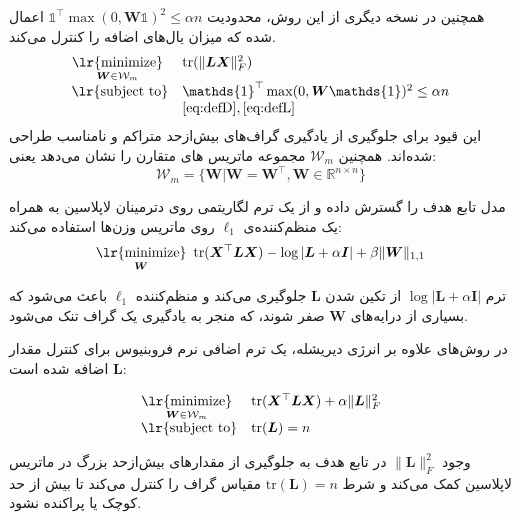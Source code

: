 \documentclass[10pt,twocolumn,a4paper]{article}
\newcommand\minimize[1]{\mathop{\text{\lr{minimize}}}\limits_{#1}\ }
\begin{document}
     همچنین در نسخه دیگری از این روش، محدودیت \( \mathds{1}^\top \max(0, \bm{W} \mathds{1})^2 \leq \alpha n \) اعمال شده که میزان یال‌های اضافه را کنترل می‌کند. 
      \begin{equation}
     	\begin{array}{cl}
     		\minimize{\bm{W}\in\mathcal{W}_m} & \text{tr}(\|\bm{L} \bm{X}\|^2_F) \\
     		\text{\lr{subject to}} & \mathds{1}^\top \max(0, \bm{W} \mathds{1})^2 \leq \alpha n  \\
     		& \eqref{eq:defD}, \eqref{eq:defL}
     	\end{array}
     \end{equation}
     این قیود برای جلوگیری از یادگیری گراف‌های بیش‌ازحد متراکم و نامناسب طراحی شده‌اند. همچنین 
     $\mathcal{W}_m$
     مجموعه ماتریس های متقارن را نشان می‌دهد یعنی:
     \begin{equation}
     	  \mathcal{W}_m = \big\{\bm{W} | \bm{W} = \bm{W}^\top, \bm{W} \in \mathds{R}^{n\times n}\big\}
     \end{equation}
     
     مدل \cite{Lake2010DiscoveringSB} تابع هدف را گسترش داده و از یک ترم لگاریتمی روی دترمینان لاپلاسین به همراه یک منظم‌کننده‌ی \( \ell_1 \) روی ماتریس وزن‌ها استفاده می‌کند:
     \begin{equation}
     	     \minimize{\bm{W}} \text{tr} (\bm{X}^\top \bm{L} \bm{X}) - \log | \bm{L} + \alpha \bm{I} | + \beta \| \bm{W} \|_{1,1}
     \end{equation}
     
     ترم \( \log | \bm{L} + \alpha \bm{I} | \) از تکین شدن \( \bm{L} \) جلوگیری می‌کند و منظم‌کننده \( \ell_1 \) باعث می‌شود که بسیاری از درایه‌های \( \bm{W} \) صفر شوند، که منجر به یادگیری یک گراف تنک می‌شود.
     
     در روش‌های
     \cite{Hu2015,Dong2016}
      علاوه بر انرژی دیریشله، یک ترم اضافی نرم فروبنیوس برای کنترل مقدار \( \bm{L} \) اضافه شده است:
     
     \begin{equation}
 		\begin{array}{cl}
    	     \minimize{\bm{W}\in\mathcal{W}_m} & \text{tr} (\bm{X}^\top \bm{L} \bm{X}) + \alpha \|\bm{L}\|_F^2 \\
 			\text{\lr{subject to}} & \text{tr}(\bm{L}) = n
 		\end{array}
     \end{equation}
     
     وجود \( \|\bm{L}\|_F^2 \) در تابع هدف به جلوگیری از مقدارهای بیش‌ازحد بزرگ در ماتریس لاپلاسین کمک می‌کند و شرط \( \text{tr}(\bm{L}) = n \) مقیاس گراف را کنترل می‌کند تا بیش از حد کوچک یا پراکنده نشود.
     
\end{document}
